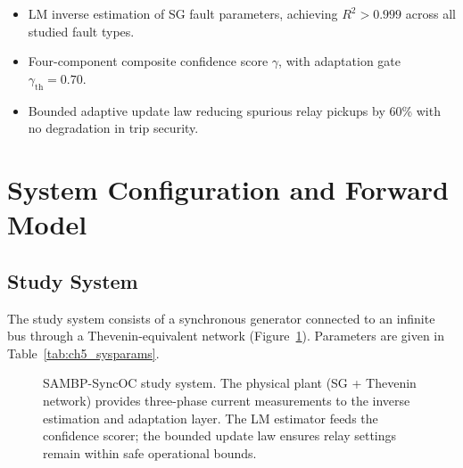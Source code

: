 \begin{itemize}
\item LM inverse estimation of SG fault parameters,
      achieving $R^2 > 0.999$ across all studied fault types.
\item Four-component composite confidence score
      $\gamma$, with adaptation gate $\gamma_\mathrm{th} = 0.70$.
\item Bounded adaptive update law reducing spurious
      relay pickups by 60\% with no degradation in trip security.
\end{itemize}

\section{System Configuration and Forward Model}
\label{sec:ch5_system}

\subsection{Study System}

The study system consists of a synchronous generator connected to an
infinite bus through a Thevenin-equivalent network (Figure~\ref{fig:ch5_system}).
Parameters are given in Table~\ref{tab:ch5_sysparams}.

\begin{figure}[htbp]
  \centering
  
  \caption{SAMBP-SyncOC study system. The physical plant (SG + Thevenin
           network) provides three-phase current measurements to the
           inverse estimation and adaptation layer. The LM estimator feeds
           the confidence scorer; the bounded update law ensures relay
           settings remain within safe operational bounds.}
  \label{fig:ch5_system}
\end{figure}

